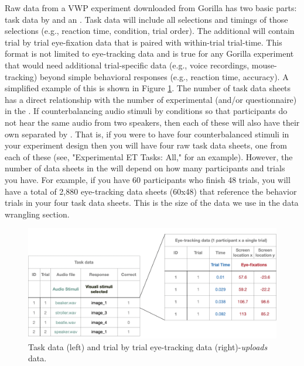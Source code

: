 Raw data from a VWP experiment downloaded from Gorilla has two basic parts: task data by  and an . Task data will include all selections and timings of those selections (e.g., reaction time, condition, trial order). The additional  will contain trial by trial eye-fixation data that is paired with within-trial trial-time. This format is not limited to eye-tracking data and is true for any Gorilla experiment that would need additional trial-specific data (e.g., voice recordings, mouse-tracking) beyond simple behavioral responses (e.g., reaction time, accuracy). A simplified example of this is shown in Figure \ref{fig:data_structure}. The number of task data sheets has a direct relationship with the number of experimental (and/or questionnaire)  in the . If counterbalancing audio stimuli by conditions so that participants do not hear the same audio from two speakers, then each of these will also have their own  separated by . That is, if you were to have four counterbalanced stimuli  in your experiment design then you will have four raw task data sheets, one from each of these  (see, "Experimental ET Tasks: All," for an example). However, the number of data sheets in the  will depend on how many participants and trials you have. For example, if you have 60 participants who finish 48 trials, you will have a total of 2,880 eye-tracking data sheets (60x48) that reference the behavior trials in your four task data sheets. This is the size of the data we use in the data wrangling section.

\begin{figure}[ht]
    \centering
    \includegraphics[scale=.3]{figures/data_structure.png}
    \caption{Task data (left) and trial by trial eye-tracking data (right)-\textit{uploads} data.}
    \label{fig:data_structure}
\end{figure}

